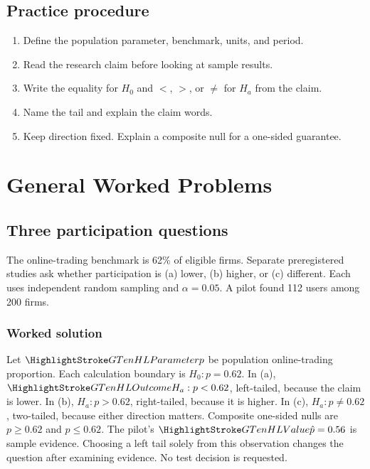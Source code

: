 \subsection{Practice procedure}
\begin{enumerate}
\item Define the population parameter, benchmark, units, and period.
\item Read the research claim before looking at sample results.
\item Write the equality for $H_0$ and $<$, $>$, or $\ne$ for $H_a$ from the claim.
\item Name the tail and explain the claim words.
\item Keep direction fixed. Explain a composite null for a one-sided guarantee.
\end{enumerate}
\section{General Worked Problems}\label{sec:general-worked}
\subsection{Three participation questions}\label{prob:claims}
The online-trading benchmark is 62\% of eligible firms. Separate preregistered studies ask whether participation is (a) lower, (b) higher, or (c) different. Each uses independent random sampling and $\alpha=0.05$. A pilot found 112 users among 200 firms.
\subsubsection*{Worked solution}\label{sol:claims}
Let $\Pop{p}$ be population online-trading proportion. Each calculation boundary is $H_0:p=0.62$. In (a), $\Result{H_a}:p<0.62$, left-tailed, because the claim is lower. In (b), $H_a:p>0.62$, right-tailed, because it is higher. In (c), $H_a:p\ne0.62$, two-tailed, because either direction matters. Composite one-sided nulls are $p\ge0.62$ and $p\le0.62$. The pilot's $\Obs{\hat p}=0.56$ is sample evidence. Choosing a left tail solely from this observation changes the question after examining evidence. No test decision is requested.
